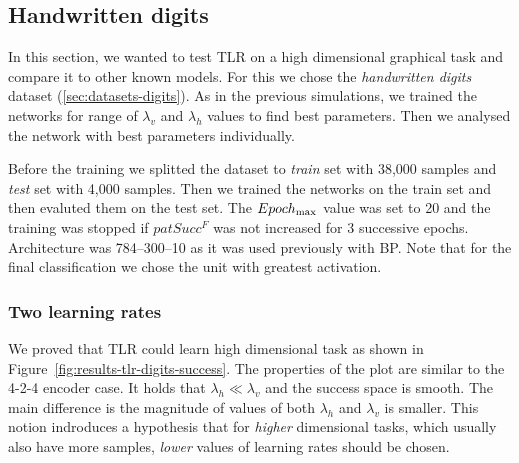 

\subsection{Handwritten digits} 
\label{sec:results-digits} 

In this section, we wanted to test TLR on a high dimensional graphical task and compare it to other known models. For this we chose the \emph{handwritten digits} dataset (\ref{sec:datasets-digits}). As in the previous simulations, we trained the networks for range of $\lambda_v$ and $\lambda_h$ values to find best parameters. Then we analysed the network with best parameters individually. 

Before the training we splitted the dataset to \emph{train} set with 38,000 samples and \emph{test} set with 4,000 samples. Then we trained the networks on the train set and then evaluted them on the test set. The $Epoch_{\rm max}$ value was set to 20 and the training was stopped if $patSucc^F$ was not increased for 3 successive epochs. Architecture was 784--300--10 as it was used previously with BP. Note that for the final classification we chose the unit with greatest activation. 

\subsubsection{Two learning rates} 
\label{sec:tlr-digits} 

We proved that TLR could learn high dimensional task as shown in Figure~\ref{fig:results-tlr-digits-success}. The properties of the plot are similar to the 4-2-4 encoder case. It holds that $\lambda_h \ll \lambda_v$ and the success space is smooth. The main difference is the magnitude of values of both $\lambda_h$ and $\lambda_v$ is smaller. This notion indroduces a hypothesis that for \emph{higher} dimensional tasks, which usually also have more samples, \emph{lower} values of learning rates should be chosen. 

